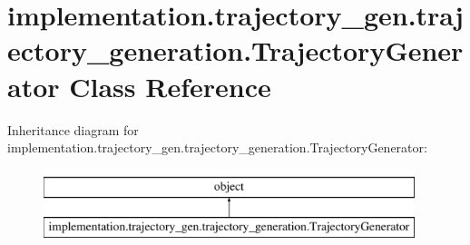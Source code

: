 \hypertarget{classimplementation_1_1trajectory__gen_1_1trajectory__generation_1_1_trajectory_generator}{}\section{implementation.\+trajectory\+\_\+gen.\+trajectory\+\_\+generation.\+Trajectory\+Generator Class Reference}
\label{classimplementation_1_1trajectory__gen_1_1trajectory__generation_1_1_trajectory_generator}
Inheritance diagram for implementation.\+trajectory\+\_\+gen.\+trajectory\+\_\+generation.\+Trajectory\+Generator\+:\begin{figure}[H]
\begin{center}
\leavevmode
\includegraphics[height=2.000000cm]{classimplementation_1_1trajectory__gen_1_1trajectory__generation_1_1_trajectory_generator}
\end{center}
\end{figure}

